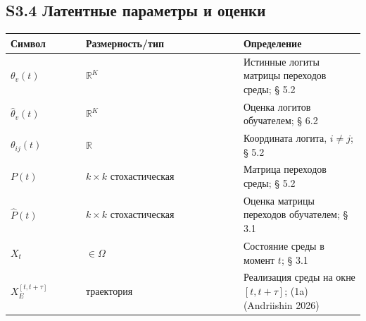 \documentclass[pdflatex,sn-mathphys-ay]{sn-jnl}
\begin{document}
\subsection*{S3.4 Латентные параметры и оценки}\label{s3.4-ux43bux430ux442ux435ux43dux442ux43dux44bux435-ux43fux430ux440ux430ux43cux435ux442ux440ux44b-ux438-ux43eux446ux435ux43dux43aux438}



\begin{center}\small
\begin{tabular}{@{} >{\raggedright\arraybackslash}p{0.2105\linewidth} >{\raggedright\arraybackslash}p{0.4474\linewidth} >{\raggedright\arraybackslash}p{0.3421\linewidth}@{}}
\toprule

\begin{minipage}[b]{\linewidth}\raggedright

Символ

\end{minipage} & \begin{minipage}[b]{\linewidth}\raggedright

Размерность/тип

\end{minipage} & \begin{minipage}[b]{\linewidth}\raggedright

Определение

\end{minipage} \\

\midrule

\(\theta_v(t)\) & \(\mathbb{R}^K\) & Истинные логиты матрицы переходов среды; § 5.2 \\

\(\hat\theta_v(t)\) & \(\mathbb{R}^K\) & Оценка логитов обучателем; § 6.2 \\

\(\theta_{ij}(t)\) & \(\mathbb{R}\) & Координата логита, \(i \ne j\); § 5.2 \\

\(P(t)\) & \(k \times k\) стохастическая & Матрица переходов среды; § 5.2 \\

\(\hat P(t)\) & \(k \times k\) стохастическая & Оценка матрицы переходов обучателем; § 3.1 \\

\(X_t\) & \(\in \Omega\) & Состояние среды в момент \(t\); § 3.1 \\

\(X_E^{[t, t+\tau]}\) & траектория & Реализация среды на окне \([t, t+\tau]\); (1a) (Andriishin 2026) \\

\bottomrule
\end{tabular}
\end{center}
\end{document}
